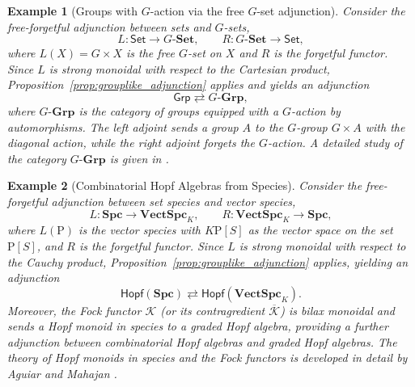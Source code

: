 \documentclass{amsart}
\newcommand{\Set}{\mathsf{Set}}
\newcommand{\Grp}{\mathsf{Grp}}
\newtheorem{example}{Example}[section]
\begin{document}
\begin{example}[Groups with $G$-action via the free $G$-set adjunction]\label{ex:g_groups}
Consider the free-forgetful adjunction between sets and $G$-sets,
\[
L:\Set\longrightarrow G\text{-}\mathbf{Set},\qquad
R:G\text{-}\mathbf{Set}\longrightarrow\Set,
\]
where \(L(X)=G\times X\) is the free \(G\)-set on \(X\) and \(R\) is the forgetful functor. Since \(L\) is strong monoidal with respect to the Cartesian product, Proposition~\ref{prop:grouplike_adjunction} applies and yields an adjunction
\[
\Grp \rightleftarrows G\text{-}\mathbf{Grp},
\]
where \(G\text{-}\mathbf{Grp}\) is the category of groups equipped with a \(G\)-action by automorphisms. The left adjoint sends a group \(A\) to the \(G\)-group \(G\times A\) with the diagonal action, while the right adjoint forgets the \(G\)-action. A detailed study of the category \(G\text{-}\mathbf{Grp}\) is given in \cite{ArroyoFacchini}.
\end{example}


\begin{example}[Combinatorial Hopf Algebras from Species]\label{ex:species_vect}
Consider the free-forgetful adjunction between set species and vector species,
\[
L:\mathbf{Spc}\longrightarrow \mathbf{VectSpc}_K, \qquad R:\mathbf{VectSpc}_K\longrightarrow \mathbf{Spc},
\]
where \(L(\mathrm{P})\) is the vector species with \(K\mathrm{P}[S]\) as the vector space on the set \(\mathrm{P}[S]\), and \(R\) is the forgetful functor. Since \(L\) is strong monoidal with respect to the Cauchy product, Proposition~\ref{prop:grouplike_adjunction} applies, yielding an adjunction
\[
\mathsf{Hopf}(\mathbf{Spc}) \rightleftarrows \mathsf{Hopf}(\mathbf{VectSpc}_K).
\]
Moreover, the Fock functor \(\mathcal{K}\) (or its contragredient \(\overline{\mathcal{K}}\)) is bilax monoidal and sends a Hopf monoid in species to a graded Hopf algebra, providing a further adjunction between combinatorial Hopf algebras and graded Hopf algebras. The theory of Hopf monoids in species and the Fock functors is developed in detail by Aguiar and Mahajan \cite{MF}.
\end{example}


\end{document}
